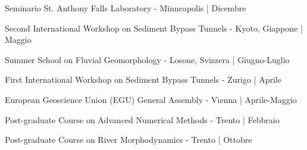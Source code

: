  Seminario St. Anthony Falls Laboratory - Minneapolis | Dicembre
\sectionsep

 Second International Workshop on Sediment Bypass Tunnels - Kyoto, Giappone | Maggio
\sectionsep

 Summer School on Fluvial Geomorphology - Losone, Svizzera | Giugno-Luglio
\sectionsep

\sectionsep

 First International Workshop on Sediment Bypass Tunnels - Zurigo | Aprile
\sectionsep

 European Geoscience Union (EGU) General Assembly - Vienna | Aprile-Maggio
\sectionsep

 Post-graduate Course on Advanced Numerical Methods - Trento | Febbraio
\sectionsep

 Post-graduate Course on River Morphodynamics - Trento | Ottobre
\sectionsep
